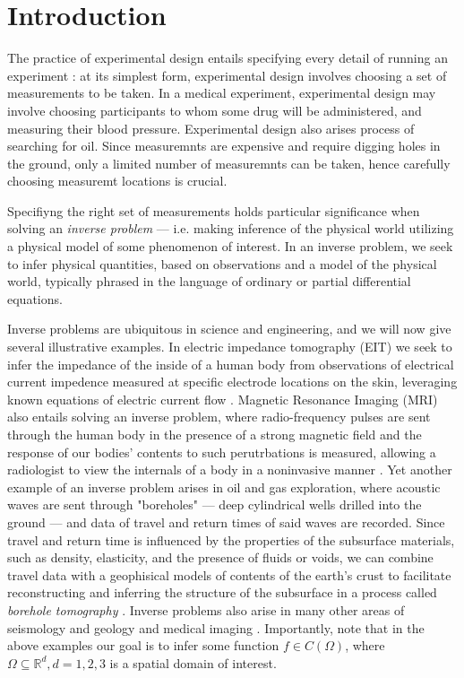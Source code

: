 \section{Introduction}\label{section:intro}
The practice of experimental design entails specifying every detail of
running an experiment \cite{chaloner}: at its simplest form,
experimental design involves choosing a set of measurements to be
taken. In a medical experiment, experimental design may involve
choosing participants to whom some drug will be administered, and
measuring their blood pressure. Experimental design also arises 
process of searching for oil. Since measuremnts are expensive and
require digging holes in the ground, only a limited number of
measuremnts can be taken, hence carefully choosing measuremt locations
is crucial.

Specifiyng the right set of measurements holds particular significance
when solving an \emph{inverse problem} --- i.e. making inference of
the physical world utilizing a physical model of some phenomenon of
interest. In an inverse problem, we seek to infer physical quantities,
based on observations and a model of the physical world, typically
phrased in the language of ordinary or partial differential equations.


Inverse problems are ubiquitous in science and engineering, and we
will now give several illustrative examples. In electric impedance
tomography (EIT) we seek to infer the impedance of the inside of a
human body from observations of electrical current impedence measured
at specific electrode locations on the skin, leveraging known
equations of electric current flow
\cite{horesh2010impedance}. Magnetic Resonance Imaging (MRI) also
entails solving an inverse problem, where radio-frequency pulses are
sent through the human body in the presence of a strong magnetic field
and the response of our bodies' contents to such perutrbations is
measured, allowing a radiologist to view the internals of a body in a
noninvasive manner \cite{horesh2008mri}. Yet another example of an
inverse problem arises in oil and gas exploration, where acoustic
waves are sent through "boreholes" --- deep cylindrical wells drilled
into the ground --- and data of travel and return times of said waves
are recorded. Since travel and return time is influenced by the
properties of the subsurface materials, such as density, elasticity,
and the presence of fluids or voids, we can combine travel data with a
geophisical models of contents of the earth's crust to facilitate
reconstructing and inferring the structure of the subsurface in a
process called \emph{borehole tomography}
\cite{horesh2008borehole}. Inverse problems also arise in many other
areas of seismology and geology \cite{rabinowitz1990, steinberg1995}
and medical imaging \cite{tarantola}. Importantly, note that in the
above examples our goal is to infer some function $f \in C(\Omega)$,
where \(\Omega \subseteq \mathbb{R}^d, d=1,2,3\) is a spatial domain
of interest.

